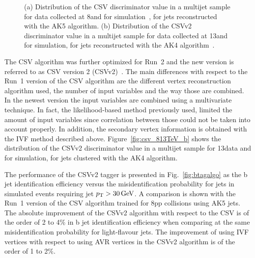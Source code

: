 \begin{figure}[!htb]
\begin{center}
\end{center} 
\caption{(a) Distribution of the CSV discriminator value in a multijet sample for data collected at 8\TeV and for simulation~\cite{CMS:BTV13001}, for jets reconstructed with the AK5 algorithm. (b) Distribution of the CSVv2 discriminator value in a multijet sample for data collected at 13\TeV and for simulation, for jets reconstructed with the AK4 algorithm~\cite{CMS-PAS-BTV-15-001}.}
\label{fig:csv_813TeV}
\end{figure}

The CSV algorithm was further optimized for Run~2 and the new version is referred to as CSV version 2 (CSVv2)~\cite{CMS-PAS-BTV-15-001}. The main differences with respect to the Run~1 version of the CSV algorithm are the different vertex reconstruction algorithm used, the number of input variables and the way those are combined. In the newest version the input variables are combined using a multivariate technique. In fact, the likelihood-based method previously used, limited the amount of input variables since correlation between those could not be taken into account properly. In addition, the secondary vertex information is obtained with the IVF method described above. Figure~\ref{fig:csv_813TeV_b} shows the distribution of the CSVv2 discriminator value in a multijet sample for 13\TeV data and for simulation, for jets clustered with the AK4 algorithm.

The performance of the CSVv2 tagger is presented in Fig.~\ref{fig:btagalgo} as the b jet identification efficiency versus the misidentification probability for jets in simulated \ttbar events requiring jet $p_{\mathrm{T}} > 30\,\text{Ge\hspace{-.08em}V}$. A comparison is shown with the Run~1 version of the CSV algorithm trained for 8\TeV pp collisions using AK5 jets. The absolute improvement of the CSVv2 algorithm with respect to the CSV is of the order of 2 to 4\% in b jet identification efficiency when comparing at the same misidentification probability for light-flavour jets. The improvement of using IVF vertices with respect to using AVR vertices in the CSVv2 algorithm is of the order of 1 to 2\%.\\

